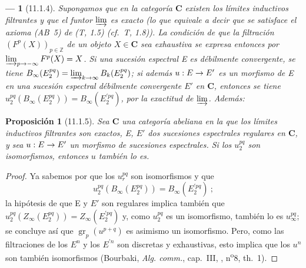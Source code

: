 \documentclass[10pt,oneside,openany]{book}
\theoremstyle{egaenv}\newtheorem*{env}{---}
\theoremstyle{egastatement}
\newtheorem*{proposition}{Proposición}
\theoremstyle{egadescription}
\newcommand{\oldpage}[2][]{\marginnote{\normalfont\scriptsize\textbf{#1}\,|\,#2}\ignorespaces}
\renewcommand{\to}{\mathchoice{\longrightarrow}{\rightarrow}{\rightarrow}{\rightarrow}}
\begin{document}
\begin{env}[11.1.4]
\label{0.11.1.4}
\label{0.11.1.4-fr}
Supongamos que en la categoría $\boldsymbol{C}$ existen los límites inductivos filtrantes y que el funtor $\varinjlim$ es \emph{exacto} (lo que equivale a decir que se satisface el axioma (AB~5) de (T, 1.5) (cf.~T, 1.8)).
La condición de que la filtración $(F^p(X))_{p\in\mathbb Z}$ de un objeto $X\in\boldsymbol{C}$ sea exhaustiva se expresa entonces por $\varinjlim_{p\to-\infty}F^p(X)=X$. Si una sucesión espectral E es débilmente convergente, se tiene
$B_\infty(E_2^{pq})=\varinjlim_{k\to\infty}B_k(E_2^{pq})$; si además $u:E\to E'$ es un morfismo de E en una sucesión espectral débilmente convergente $E'$ en $\boldsymbol{C}$, entonces se tiene $u_2^{pq}(B_\infty(E_2^{pq}))=B_\infty(E_2^{\prime pq})$, por la exactitud de $\varinjlim$.
Además:
\end{env}

\begin{proposition}[11.1.5]
\label{0.11.1.5}
\label{0.11.1.5-fr}
Sea $\mathbf{C}$ una categoría abeliana en la que los límites
inductivos filtrantes son exactos, \textup{E}, $E'$ dos sucesiones espectrales regulares en $\mathbf{C}$, y sea $u:E\to E'$ un morfismo de sucesiones espectrales.
Si los $u_2^{pq}$ son isomorfismos, entonces $u$ también lo es.
\end{proposition}

\begin{proof}
Ya sabemos por  que los $u_r^{pq}$ son isomorfismos y que
\[
  u_2^{pq}(B_\infty(E_2^{pq}))=B_\infty(E_2^{\prime pq})~;
\]
\oldpage[0\textsubscript{III}]{26}
la hipótesis de que E y $E'$ son regulares implica también que $u_2^{pq}(Z_\infty(E_2^{pq}))=Z_\infty(E_2^{\prime pq})$ y, como $u_2^{pq}$ es un isomorfismo, también lo es $u_\infty^{pq}$; se concluye así que $\operatorname{gr}_p(u^{p+q})$ es asimismo un isomorfismo.
Pero, como las filtraciones de los $E^n$ y los $E^{\prime n}$ son discretas y exhaustivas, esto implica que los $u^n$ son también isomorfismos (Bourbaki, \emph{Alg. comm.}, cap.~III, , n\textsuperscript{o}8, th.~1).
\end{proof}
\end{document}
